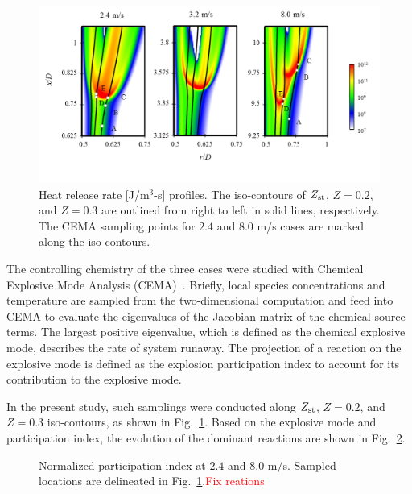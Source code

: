 \documentclass{wssci}
\begin{document}
\begin{figure}
  \centering
  \scriptsize
  \vspace{-0.1in}
  \includegraphics[width=1.0\textwidth]{HRR_V.png}
  \normalsize
  \vspace{-0.6in}
  \caption{Heat release rate [J/m$^3$-s] profiles.  The iso-contours of $Z_{\rm st}$, $Z = 0.2$, and $Z = 0.3$ are outlined from right to left in solid lines, respectively.  The CEMA sampling points for $2.4$ and $8.0$ m/s cases are marked along the iso-contours.}
  \label{fig:HRR_V}
\end{figure}

The controlling chemistry of the three cases were studied with Chemical Explosive Mode Analysis (CEMA)~\cite{lu10,shan12}.   Briefly, local species concentrations and temperature are sampled from the two-dimensional computation and feed into CEMA to evaluate the eigenvalues of the Jacobian matrix of the chemical source terms.  The largest positive eigenvalue, which is defined as the chemical explosive mode, describes the rate of system runaway.  The projection of a reaction on the explosive mode is defined as the explosion participation index to account for its contribution to the explosive mode.

In the present study, such samplings were conducted along $Z_{\rm st}$, $Z = 0.2$, and $Z = 0.3$ iso-contours, as shown in Fig.~\ref{fig:HRR_V}.  Based on the explosive mode and participation index, the evolution of the dominant reactions are shown in Fig.~\ref{fig:CEMA_V}.

\begin{figure}
  \centering
  \scriptsize
  
  
  \normalsize
  \caption{Normalized participation index at $2.4$ and $8.0$ m/s.  Sampled locations are delineated in Fig.~\ref{fig:HRR_V}.\textcolor{red}{Fix reations}}
  \label{fig:CEMA_V}
\end{figure}
\end{document}
